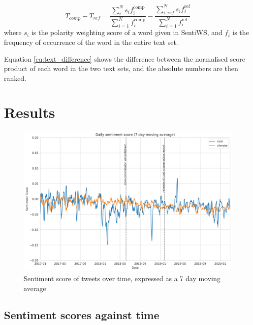 \documentclass[12pt,onecolumn,twoside]{layout}
\begin{document}
\begin{equation}
\label{eq:text_difference}
T_{comp} - T_{ref} = \frac{\sum_{i}^{N} s_i f_i^{\text{comp}}}{\sum_{i=1}^{N} f_i^{\text{comp}}} - \frac{\sum_{i,ref}^{N} s_i f_i^{\text{ref}}}{\sum_{i=1}^{N} f_i^{\text{ref}}}
\end{equation} 	
where \(s_i\) is the polarity weighting score of a word given in SentiWS, and \(f_i\) is the frequency of occurrence of the word in the entire text set. 

Equation \ref{eq:text_difference} shows the difference between the normalised score product of each word in the two text sets, and the absolute numbers are then ranked. 

 

\section*{Results} \label{sec:results}

\begin{figure} 
	\begin{center}
		\includegraphics[width=\linewidth]{figures/sa_dailyavgsenti_7dma_baseline2}
	\end{center}
	\caption{Sentiment score of tweets over time, expressed as a 7 day moving average}
	\label{fig:tweet_score}
\end{figure}

\subsection*{Sentiment scores against time} 
\end{document}
